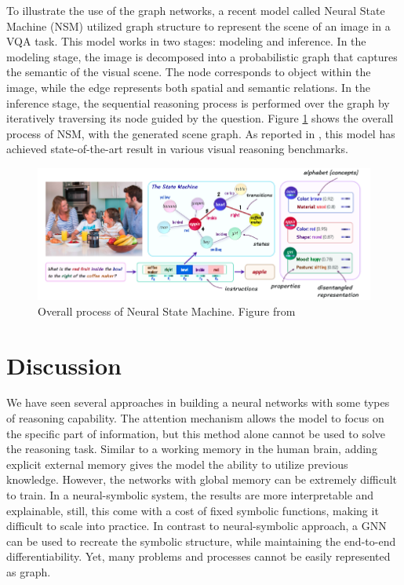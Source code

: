 \documentclass[journal]{IEEEtran}
\begin{document}
To illustrate the use of the graph networks, a recent model called Neural State Machine (NSM) \cite{hudson2019learning} utilized graph structure to represent the scene of an image in a VQA task.
This model works in two stages: modeling and inference. 
In the modeling stage, the image is decomposed into a probabilistic graph that captures the semantic of the visual scene.
The node corresponds to object within the image, while the edge represents both spatial and semantic relations.
In the inference stage, the sequential reasoning process is performed over the graph by iteratively traversing its node guided by the question.
Figure \ref{nsm} shows the overall process of NSM, with the generated scene graph.
As reported in \cite{hudson2019learning}, this model has achieved state-of-the-art result in various visual reasoning benchmarks.

\begin{figure}[htb]
  \includegraphics[width=\linewidth]{NSM.png}
  \caption{Overall process of Neural State Machine. Figure from \cite{hudson2019learning}}
  \label{nsm}
\end{figure}

\section{Discussion}

We have seen several approaches in building a neural networks with some types of reasoning capability.
The attention mechanism allows the model to focus on the specific part of information, 
but this method alone cannot be used to solve the reasoning task.
Similar to a working memory in the human brain, 
adding explicit external memory gives the model the ability to utilize previous knowledge.
However, the networks with global memory can be extremely difficult to train. 
In a neural-symbolic system, the results are more interpretable and explainable,
still, this come with a cost of fixed symbolic functions, making it difficult to scale into practice.
In contrast to neural-symbolic approach, a GNN can be used to recreate the symbolic structure, 
while maintaining the end-to-end differentiability. Yet, many problems and processes cannot be easily represented as graph.
\end{document}
